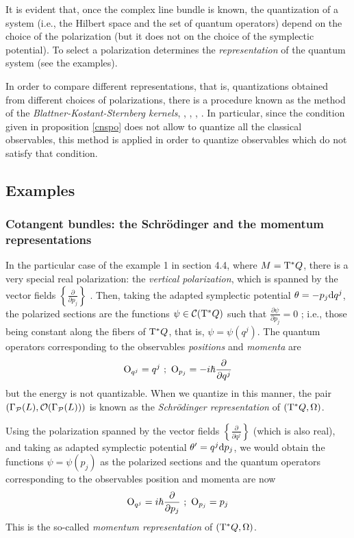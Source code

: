 \documentclass[12pt]{article}
\def\dst{\(}
\def\derpar#1#2{\frac{\partial{#1}}{\partial{#2}}}
\def\d{{\rm d}}
\def\C{{\cal C}}
\def\P{{\cal P}}
\def\Op{{\rm O}}
\def\Tan{{\rm T}}
\begin{document}
It is evident that, once the complex line bundle is known,
the quantization of a system
(i.e., the Hilbert space and the set of quantum operators)
depend on the choice of the polarization
(but it does not on the choice of the symplectic potential).
To select a polarization determines the
{\it representation} of the quantum system
(see the examples).

In order to compare different representations, that is,
quantizations obtained from different choices of polarizations,
there is a procedure known as the method of the {\it
Blattner-Kostant-Sternberg kernels},
\cite{Bl-73}, \cite{Bl-75}, \cite{Bl-77}, \cite{GS-77}.
In particular, since the condition given in proposition
\ref{cnspo} does not allow to quantize all the classical observables,
this method is applied in order to quantize observables
which do not satisfy that condition.




\subsection{Examples}


\subsubsection{Cotangent bundles: the Schr\"odinger and
the momentum representations}


In the particular case of the example 1 in section 4.4,
where  $M = \Tan^* Q$,
there is a very special real polarization:
the {\it vertical polarization},
which is spanned by the vector fields
\dst\left\{ \derpar{}{p_j} \right\}\) .
Then, taking the adapted symplectic potential
$\theta = -p_j \d q^j$,
the polarized sections are the functions
$\psi \in \C (\Tan^*Q)$
such that \dst\derpar{\psi}{p_j} = 0\) ;
i.e., those being constant along the fibers of $\Tan^*Q$,
that is, $\psi = \psi (q^j)$.
The quantum operators corresponding to the observables
{\it positions} and {\it momenta} are
$$
\Op_{q^j} = q^j \  ; \
\Op_{p_j} = -i\hbar \derpar{}{q^j}
$$
but the energy is not quantizable.
When we quantize in this manner, the pair
$(\Gamma_\P (L),{\cal O}(\Gamma_\P (L)))$
is known as the {\it Schr\"{o}dinger representation}
of $(\Tan^*Q,\Omega )$.

Using the polarization spanned by the vector fields
\dst\left\{ \derpar{}{q^j} \right\}\)
(which is also real), and taking as adapted symplectic potential
$\theta ' = q^j \d p_j$,
we would obtain the functions
$\psi = \psi (p_j)$ as the polarized sections and
the quantum operators corresponding to the observables
position and momenta are now
$$
\Op_{q^j} = i\hbar \derpar{}{p_j}
\ ; \ \Op_{p_j} = p_j
$$
This is the so-called
{\it momentum representation} of $(\Tan^*Q,\Omega )$.
\end{document}
